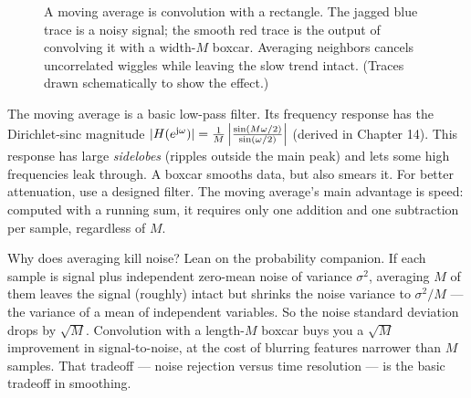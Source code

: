 \begin{figure}[H]
\centering
{}
\caption{A moving average is convolution with a rectangle. The jagged blue
trace is a noisy signal; the smooth red trace is the output of convolving it
with a width-$M$ boxcar. Averaging neighbors cancels uncorrelated wiggles while
leaving the slow trend intact. (Traces drawn schematically to show the effect.)}
\label{ch13:fig-movavg}
\end{figure}

\begin{trapbox}
The moving average is a basic low-pass filter. Its frequency response has the Dirichlet-sinc magnitude $\lvert H(e^{\mathrm{j}\omega})\rvert = \frac{1}{M}\left|\frac{\sin(M\omega/2)}{\sin(\omega/2)}\right|$ (derived in Chapter 14). This response has large \emph{sidelobes} (ripples outside the main peak) and lets some high frequencies leak through. A boxcar smooths data, but also smears it. For better attenuation, use a designed filter. The moving average's main advantage is speed: computed with a running sum, it requires only one addition and one subtraction per sample, regardless of $M$.
\end{trapbox}

\begin{connectionbox}
Why does averaging kill noise? Lean on the probability companion. If each sample
is signal plus independent zero-mean noise of variance $\sigma^2$, averaging $M$
of them leaves the signal (roughly) intact but shrinks the noise variance to
$\sigma^2/M$ --- the variance of a mean of independent variables. So the
noise standard deviation drops by $\sqrt{M}$. Convolution with a length-$M$
boxcar buys you a $\sqrt{M}$ improvement in signal-to-noise, at the cost of
blurring features narrower than $M$ samples. That tradeoff --- noise rejection
versus time resolution --- is the basic tradeoff in smoothing.
\end{connectionbox}

